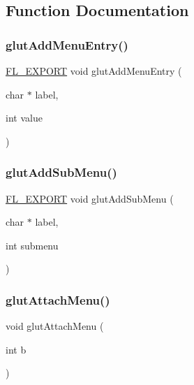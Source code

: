 \subsection{Function Documentation}
\mbox{\label{glut_8_h_a8de8f9e59d2c64201a712daa2c74095b}} 
\subsubsection{\texorpdfstring{glut\+Add\+Menu\+Entry()}{glutAddMenuEntry()}}
{\footnotesize\ttfamily \hyperlink{_fl___export_8_h_aa9ba29a18aee9d738370a06eeb4470fc}{F\+L\+\_\+\+E\+X\+P\+O\+RT} void glut\+Add\+Menu\+Entry (\begin{DoxyParamCaption}\item[{char $\ast$}]{label,  }\item[{int}]{value }\end{DoxyParamCaption})}

\mbox{\label{glut_8_h_a675b66584d18b48ea28e43664875d4ac}} 
\subsubsection{\texorpdfstring{glut\+Add\+Sub\+Menu()}{glutAddSubMenu()}}
{\footnotesize\ttfamily \hyperlink{_fl___export_8_h_aa9ba29a18aee9d738370a06eeb4470fc}{F\+L\+\_\+\+E\+X\+P\+O\+RT} void glut\+Add\+Sub\+Menu (\begin{DoxyParamCaption}\item[{char $\ast$}]{label,  }\item[{int}]{submenu }\end{DoxyParamCaption})}

\mbox{\label{glut_8_h_a56fb6ff3da578bc0d185f41746f347cf}} 
\subsubsection{\texorpdfstring{glut\+Attach\+Menu()}{glutAttachMenu()}}
{\footnotesize\ttfamily void glut\+Attach\+Menu (\begin{DoxyParamCaption}\item[{int}]{b }\end{DoxyParamCaption})\hspace{0.3cm}{\ttfamily [inline]}}

